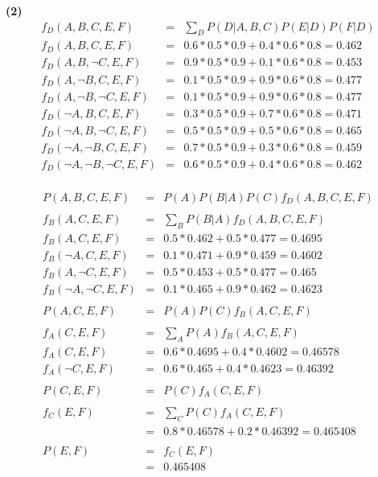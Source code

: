\documentclass[11pt]{article}
\renewcommand{\part}[1] {\vspace{.10in} {\bf (#1)}}
\begin{document}
\part{2}
\begin{eqnarray*}
f_D(A, B, C, E, F) &=& \sum_D P(D|A,B,C)P(E|D)P(F|D)\\
f_D(A, B, C, E, F) &=& 0.6*0.5*0.9 + 0.4*0.6*0.8 = 0.462\\
f_D(A, B, \neg C, E, F) &=& 0.9*0.5*0.9+0.1*0.6*0.8 = 0.453\\
f_D(A, \neg B, C, E, F) &=& 0.1*0.5*0.9 + 0.9*0.6*0.8 = 0.477\\
f_D(A, \neg B, \neg C, E, F) &=& 0.1*0.5*0.9+0.9*0.6*0.8 = 0.477\\
f_D(\neg A, B, C, E, F) &=& 0.3*0.5*0.9+0.7*0.6*0.8 = 0.471\\
f_D(\neg A, B, \neg C, E, F) &=& 0.5*0.5*0.9+0.5*0.6*0.8 = 0.465\\
f_D(\neg A, \neg B, C, E, F) &=& 0.7*0.5*0.9+0.3*0.6*0.8 = 0.459\\
f_D(\neg A, \neg B, \neg C, E, F) &=& 0.6*0.5*0.9+0.4*0.6*0.8 = 0.462\\
\end{eqnarray*}

\begin{eqnarray*}
P(A, B, C, E, F) &=& P(A)P(B|A)P(C)f_D(A, B, C, E, F)\\
\\
f_B(A, C, E, F) &=& \sum_B P(B|A)f_D(A, B, C, E, F)\\
f_B(A, C, E, F) &=& 0.5*0.462 + 0.5*0.477 = 0.4695\\
f_B(\neg A, C, E, F) &=& 0.1*0.471 + 0.9*0.459 = 0.4602\\
f_B(A, \neg C, E, F) &=& 0.5*0.453 + 0.5*0.477 = 0.465\\
f_B(\neg A, \neg C, E, F) &=& 0.1* 0.465 + 0.9*0.462 = 0.4623\\
\\
P(A, C, E, F) &=&  P(A)P(C)f_B(A, C, E, F)\\
\\
f_A(C, E, F)  &=& \sum_A P(A)f_B(A, C, E, F)\\
f_A(C, E, F) &=& 0.6*0.4695 + 0.4*0.4602 = 0.46578\\
f_A(\neg C, E, F) &=& 0.6*0.465 + 0.4*0.4623 = 0.46392\\
\\
P(C, E, F) &=& P(C)f_A(C, E, F)\\
\\
f_C(E, F) &=& \sum_C P(C)f_A(C, E, F)\\
&=& 0.8*0.46578 + 0.2*0.46392 = 0.465408\\
\\
P(E, F) &=& f_C(E, F)\\
&=& 0.465408\\
\end{eqnarray*}
\end{document}
